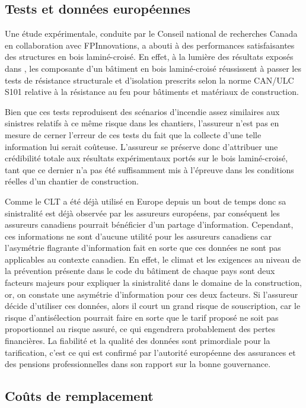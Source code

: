 \documentclass[11pt]{article}
\begin{document}
\subsection{Tests et données européennes}
\label{tests_euro}
Une étude expérimentale, conduite par le Conseil national de recherches Canada en collaboration avec FPInnovations, a abouti à des performances satisfaisantes des structures en bois laminé-croisé. En effet, à la lumière des résultats exposés dans \cite{CLThandbook}, les composante d'un bâtiment en bois laminé-croisé réussissent à passer les tests de résistance structurale et d'isolation prescrits selon la norme CAN/ULC S101 relative à la résistance au feu pour bâtiments et matériaux de construction. 


Bien que ces tests reproduisent des scénarios d'incendie assez similaires aux sinistres relatifs à ce même risque dans les chantiers,  l'assureur n'est pas en mesure de cerner l'erreur de ces tests du fait que la collecte d'une telle information lui serait coûteuse. L'assureur se préserve donc d'attribuer une crédibilité totale aux résultats expérimentaux portés sur le bois laminé-croisé, tant que ce dernier n'a pas été suffisamment mis à l'épreuve dans les conditions réelles d'un chantier de construction.

Comme le CLT a été déjà utilisé en Europe depuis un bout de temps donc sa sinistralité est déjà observée par les assureurs européens, par conséquent les assureurs canadiens pourrait bénéficier d'un partage d'information. Cependant, ces informations ne sont d'aucune utilité pour les assureurs canadiens car l'asymétrie flagrante d'information fait en sorte que ces données ne sont pas applicables au contexte canadien. En effet, le climat et les exigences au niveau de la prévention présente dans le code du bâtiment de chaque pays sont deux facteurs majeurs pour expliquer la sinistralité dans le domaine de la construction, or, on constate une asymétrie d'information pour ces deux facteurs. Si l'assureur décide d'utiliser ces données, alors il court un grand risque de souscription, car le risque d'antisélection pourrait faire en sorte que le tarif proposé ne soit pas proportionnel au risque assuré, ce qui engendrera probablement des pertes financières. La fiabilité et la qualité des données sont primordiale pour la tarification, c'est ce qui est confirmé par l'autorité européenne des assurances et des pensions professionnelles dans son rapport \cite{EICPA}sur la bonne gouvernance. 

\subsection{Coûts de remplacement}
\end{document}
